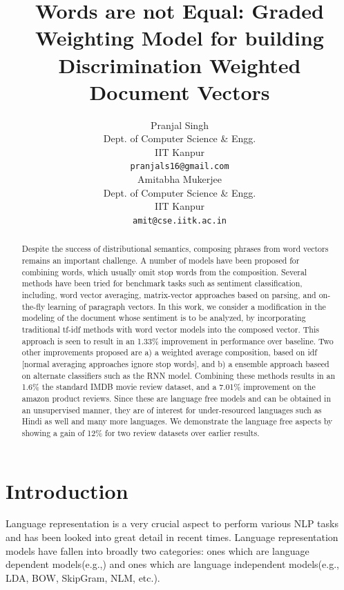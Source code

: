\documentclass[11pt,a4paper]{article}
\title{Words are not Equal: Graded Weighting Model for building Discrimination Weighted Document Vectors}
\author{Pranjal Singh \\
  Dept. of Computer Science \& Engg. \\
  IIT Kanpur \\
  {\tt pranjals16@gmail.com} \\\And
  Amitabha Mukerjee \\
  Dept. of Computer Science \& Engg. \\
  IIT Kanpur \\
  {\tt amit@cse.iitk.ac.in} \\}
\date{}
\begin{document}
\maketitle
\begin{abstract}
Despite the success of distributional semantics, composing phrases from word vectors remains an important challenge.  A number of models have been proposed for combining words, which usually omit stop words from the composition.  Several methods have been tried for benchmark tasks such as sentiment classification, including, word vector averaging, matrix-vector approaches based on parsing, and on-the-fly learning of paragraph vectors. In this work, we consider a modification in the modeling of the document whose sentiment is to be analyzed, by incorporating traditional tf-idf methods with word vector models into the composed vector.  This approach is seen to result in an 1.33\% improvement in performance over baseline.
Two other improvements proposed are a) a weighted average composition, based on idf [normal averaging approaches ignore stop words], and b) a ensemble approach baseed on alternate classifiers such as the RNN model. Combining these methods results in an 1.6\% the standard IMDB movie review dataset, and a 7.01\% improvement on the amazon product reviews. Since these are language free models and can
be obtained in an unsupervised manner, they are of interest for under-resourced languages such as Hindi as well and many more languages.  We demonstrate the language free aspects by showing a gain of 12\% for two review datasets over earlier results.
\end{abstract}

\section{Introduction}
Language representation is a very crucial aspect to perform various NLP tasks and has been looked into great detail in recent times. Language representation models have fallen into broadly two categories: ones which are language dependent models(e.g.,\cite{Socher:13}) and ones which are language independent models(e.g., LDA, BOW, SkipGram, NLM, etc.). 
\end{document}

